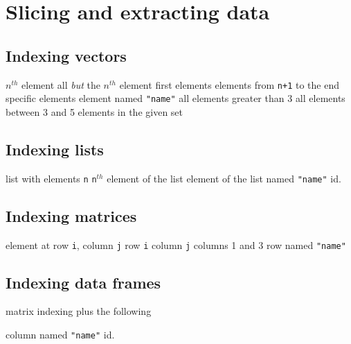 {\section{Slicing and extracting data}{}

\subsection{Indexing vectors}{}
	{ $ n^{th} $ element}
	{all {\it but} the $ n^{th} $ element}
	{first elements}
	{elements from {\tt n+1} to the end}
	{specific elements}
	{element named {\tt "name"}}
	{all elements greater than 3}
	{all elements between 3 and 5}
	{elements in the given set}

\subsection{Indexing lists}{}

	{list with elements {\tt n}}
	{{\tt n}$^{th}$ element of the list}
	{element of the list named {\tt "name"}}
	{id.}


\subsection{Indexing matrices}{}

	{element at row {\tt i}, column {\tt j}}
	{row {\tt i}}
	{column {\tt j}}
	{columns 1 and 3}
	{row named {\tt "name"}}

\subsection{Indexing data frames}{matrix indexing plus the following}

	{column named {\tt "name"}}
	{id.}

}
